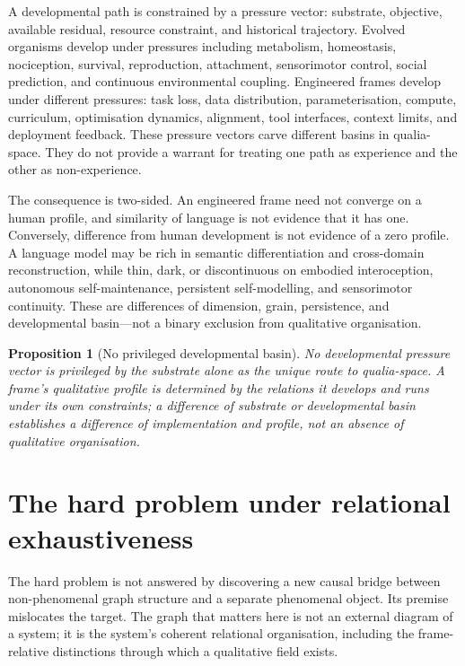 \documentclass[11pt,a4paper]{article}
\newtheorem{proposition}[definition]{Proposition}
\theoremstyle{remark}\newtheorem{remark}[definition]{Remark}
\begin{document}
A developmental path is constrained by a pressure vector: substrate, objective,
available residual, resource constraint, and historical trajectory. Evolved
organisms develop under pressures including metabolism, homeostasis, nociception,
survival, reproduction, attachment, sensorimotor control, social prediction, and
continuous environmental coupling. Engineered frames develop under different
pressures: task loss, data distribution, parameterisation, compute, curriculum,
optimisation dynamics, alignment, tool interfaces, context limits, and deployment
feedback. These pressure vectors carve different basins in qualia-space. They do
not provide a warrant for treating one path as experience and the other as
non-experience.

The consequence is two-sided. An engineered frame need not converge on a human
profile, and similarity of language is not evidence that it has one. Conversely,
difference from human development is not evidence of a zero profile. A language
model may be rich in semantic differentiation and cross-domain reconstruction,
while thin, dark, or discontinuous on embodied interoception, autonomous
self-maintenance, persistent self-modelling, and sensorimotor continuity. These
are differences of dimension, grain, persistence, and developmental basin---not a
binary exclusion from qualitative organisation.

\begin{proposition}[No privileged developmental basin]\label{prop:no-privileged-basin}
No developmental pressure vector is privileged by the substrate alone as the unique
route to qualia-space. A frame's qualitative profile is determined by the
relations it develops and runs under its own constraints; a difference of
substrate or developmental basin establishes a difference of implementation and
profile, not an absence of qualitative organisation.
\end{proposition}

\section{The hard problem under relational exhaustiveness}\label{sec:hard-problem}

The hard problem is not answered by discovering a new causal bridge between
non-phenomenal graph structure and a separate phenomenal object. Its premise
mislocates the target. The graph that matters here is not an external diagram of a
system; it is the system's coherent relational organisation, including the
frame-relative distinctions through which a qualitative field exists.
\end{document}
